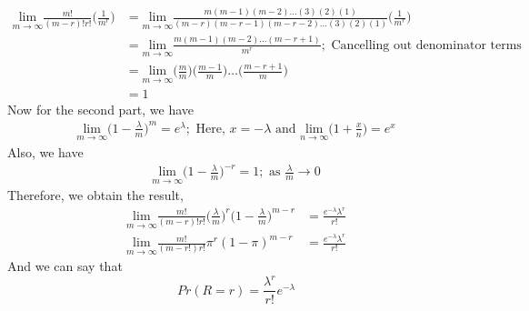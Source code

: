 \documentclass[11pt]{article}
\begin{document}
\begin{equation}
  \nonumber
  \begin{aligned}
    \underset{{m \xrightarrow{} \infty}}{\text{lim}} \frac{m!}{(m-r)!r!}\bigg(\frac{1}{m^r}\bigg) & = \underset{{m \xrightarrow{} \infty}}{\text{lim}} \frac{m(m-1)(m-2)\dots(3)(2)(1)}{(m-r)(m-r-1)(m-r-2) \dots (3)(2)(1)} \bigg(\frac{1}{m^r}\bigg)\\
    & = \underset{{m \xrightarrow{} \infty}}{\text{lim}} \frac{m(m-1)(m-2) \dots (m-r+1)}{m^r}; \text{ Cancelling out denominator terms}\\
    & = \underset{{m \xrightarrow{} \infty}}{\text{lim}} \bigg(\frac{m}{m}\bigg)\bigg(\frac{m-1}{m}\bigg)\dots\bigg(\frac{m-r+1}{m}\bigg)\\
    & = 1
  \end{aligned}
\end{equation}
Now for the second part, we have
\begin{equation}
  \nonumber
  \begin{aligned}
    \underset{{m \xrightarrow{} \infty}}{\text{lim}} \bigg(1 - \frac{\lambda}{m}\bigg)^{m} = e^{\lambda}; \text{ Here, } x = -\lambda \text{ and } \underset{{n \xrightarrow{} \infty}}{\text{lim}} \bigg(1 + \frac{x}{n}\bigg) = e^{x}
  \end{aligned}
\end{equation}
Also, we have
\begin{equation}
  \nonumber
  \begin{aligned}
    \underset{{m \xrightarrow{} \infty}}{\text{lim}} \bigg(1 - \frac{\lambda}{m}\bigg)^{-r} = 1; \text{ as } \frac{\lambda}{m} \xrightarrow{} 0
  \end{aligned}
\end{equation}
Therefore, we obtain the result,
\begin{equation}
  \nonumber
  \begin{aligned}
    \underset{{m \xrightarrow{} \infty}}{\text{lim}} \frac{m!}{(m-r)!r!}\bigg(\frac{\lambda}{m}\bigg)^{r} \bigg(1 - \frac{\lambda}{m}\bigg)^{m-r} & = \frac{e^{-\lambda}\lambda^{r}}{r!}\\
    \underset{{m \xrightarrow{} \infty}}{\text{lim}}\frac{m!}{(m-r!)r!} \pi^{r}(1-\pi)^{m-r} & = \frac{e^{-\lambda}\lambda^{r}}{r!}
  \end{aligned}
\end{equation}
And we can say that
\begin{equation}
  \nonumber
  Pr(R = r) = \frac{\lambda^{r}}{r!}e^{-\lambda}
\end{equation}
\end{document}
